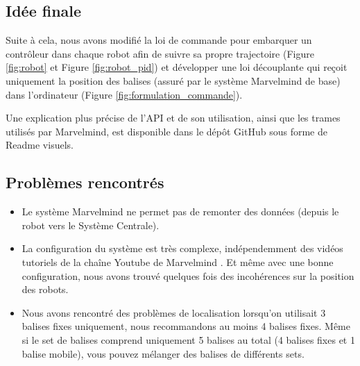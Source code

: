 \subsection{Idée finale}
Suite à cela, nous avons modifié la loi de commande pour embarquer un contrôleur dans chaque robot afin de suivre sa propre trajectoire (Figure \ref{fig:robot} et Figure \ref{fig:robot_pid}) et développer une loi découplante qui reçoit uniquement la position des balises (assuré par le système Marvelmind de base) dans l'ordinateur (Figure \ref{fig:formulation_commande}). 

Une explication plus précise de l'API et de son utilisation, ainsi que les trames utilisés par Marvelmind, est disponible dans le dépôt GitHub sous forme de Readme visuels. 
\subsection{Problèmes rencontrés}
\begin{itemize}
    \item Le système Marvelmind ne permet pas de remonter des données (depuis le robot vers le Système Centrale).
    \item La configuration du système est très complexe, indépendemment des vidéos tutoriels de la chaîne Youtube de Marvelmind \cite{marvelmind-youtube}. Et même avec une bonne configuration, nous avons trouvé quelques fois des incohérences sur la position des robots. 
    \item Nous avons rencontré des problèmes de localisation lorsqu'on utilisait 3 balises fixes uniquement, nous recommandons au moins 4 balises fixes. Même si le set de balises comprend uniquement 5 balises au total (4 balises fixes et 1 balise mobile), vous pouvez mélanger des balises de différents sets. 
    
\end{itemize}
